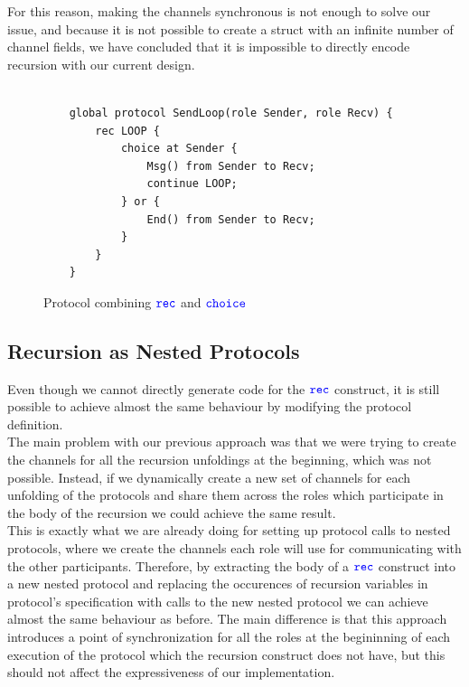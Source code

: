 \documentclass[12pt,twoside]{report}
\begin{document}
For this reason, making the channels synchronous is not enough to solve our issue, and because it is not possible to create a struct with an infinite number of channel fields, we have concluded that it is impossible to directly encode recursion with our current design. 

\begin{figure}[htb!]
    \centering
    \lstset{language=Scribble}
    \begin{lstlisting}
    
    global protocol SendLoop(role Sender, role Recv) {
        rec LOOP {
            choice at Sender {
                Msg() from Sender to Recv;
                continue LOOP;
            } or {
                End() from Sender to Recv;
            }
        }
    }
    \end{lstlisting}
    \caption{Protocol combining ${\color{blue}\mathtt{rec}}$ and ${\color{blue}\mathtt{choice}}$}
    \label{recursion-choice-protocol}
\end{figure}{}

\subsection{Recursion as Nested Protocols}
Even though we cannot directly generate code for the ${\color{blue}\mathtt{rec}}$ construct, it is still possible to achieve almost the same behaviour by modifying the protocol definition.\\

The main problem with our previous approach was that we were trying to create the channels for all the recursion unfoldings at the beginning, which was not possible. Instead, if we dynamically create a new set of channels for each unfolding of the protocols and share them across the roles which participate in the body of the recursion we could achieve the same result.\\

This is exactly what we are already doing for setting up protocol calls to nested protocols, where we create the channels each role will use for communicating with the other participants. Therefore, by extracting the body of a ${\color{blue}\mathtt{rec}}$ construct into a new nested protocol and replacing the occurences of recursion variables in protocol's specification with calls to the new nested protocol we can achieve almost the same behaviour as before. The main difference is that this approach introduces a point of synchronization for all the roles at the begininning of each execution of the protocol which the recursion construct does not have, but this should not affect the expressiveness of our implementation.\\
\end{document}
